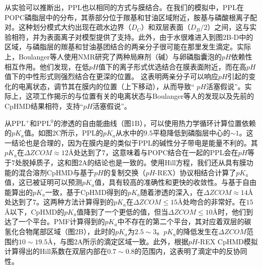 \documentclass[journal=,manuscript=artical,email=false]{achemso}
\begin{document}
从实验可以推断出，PPL也以相同的方式与膜结合。在我们的模拟中，PPL在POPC磷脂层中的分布，其萘部分位于羰基和甘油区域附近，胺基与磷酸根离子配对。这种划分模式大约出现在疏水边界（$D_C$）和双层表面（$D_B / 2$）之间，这与实验相符，并为表面离子对模型提供了支持。此外，由于水很难进入到图2B-D中的区域，与磷脂层的羰基和甘油基团结合的两亲分子很可能在那里发生滴定。实际上，Boulanger等人使用NMR研究了两种局麻剂（碱）与卵磷脂囊泡的$pH$依赖性相互作用。他们发现，在低$pH$值下的离子形式优选结合在膜表面附近，而在高$pH$值下的中性形式则强烈结合在更深的位置。
这表明两亲分子可以响应$pH$引起的变化的电离状态，调节其在膜内的位置（上下移动），从而导致“ $pH$活塞假说”。实际上，这项工作揭示的与位置有关的电离状态与Boulanger等人的发现以及先前的CpHMD结果相符，支持“$pH$活塞假说”。

从PPL$^{+}$和PPL$^{0}$的渗透的自由能曲线（图1B），可以使用热力学循环计算位置依赖的$pK_a$值。如图2C所示，PPL的$pK_a$从水中的$9.5$平稳降低到磷脂层中心的$\sim 1$。这一结论也是合理的，因为在膜内是的类似于PPL的碱性分子带电是能量不利的。其$pK_a$在$\Delta ZCOM \approx 12$\AA 处达到了$7$，这意味着与POPC结合在一起的PPL会在$pH$等于7处脱掉质子，这和图2A的结论也是一致的。使用Hill方程，我们还从具有膜功能的混合溶剂CpHMD与基于$pH$的复制交换（$pH$-REX）协议相结合计算了$pK_a$值，这已被证明可以预测$pK_a$值，具有较高的准确性和更快的收敛性。与基于自由能算出的$pK_a$一致，基于CpHMD得到的$pK_a$随着渗透的深入，在$\Delta ZCOM \approx 14$\AA 处达到了$7$。这两种方法计算得到的$pK_a$在$\Delta ZCOM \le 15$\AA 处吻合的非常好。在$15$\AA 以下，CpHMD的$pK_a$值降到了一个更低的值，但当$\Delta ZCOM \le 10$\AA 时，他们到达了一个平台。PMF计算得到的$pK_a$中不存在的第二个平台，其对应着双层的碳氢化合物尾部区域（图2B），此时的$pK_a$为$2.5\sim 3$。$pK_a$的降低发生在$\Delta ZCOM$范围约$10\sim 19.5$\AA，与图2A所示的滴定区域一致。此外，根据$pH$-REX CpHMD模拟计算得出的Hill系数在双层内部在$0.7\sim 0.8$的范围内，这表明了滴定中的反协同性。
\end{document}
